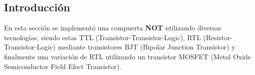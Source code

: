 \documentclass[a4paper]{article}
\begin{document}
\subsection{Introducción}
En esta sección se implementó una compuerta \textbf{NOT} utilizando diversas tecnologías, siendo estas TTL (Transistor-Transistor-Logic), RTL (Resistor-Transistor-Logic) mediante transistores BJT (Bipolar Junction Transistor) y finalmente una variación de RTL utilizando un transistor MOSFET (Metal Oxide Semiconductor Field Efect Transistor).
\end{document}
